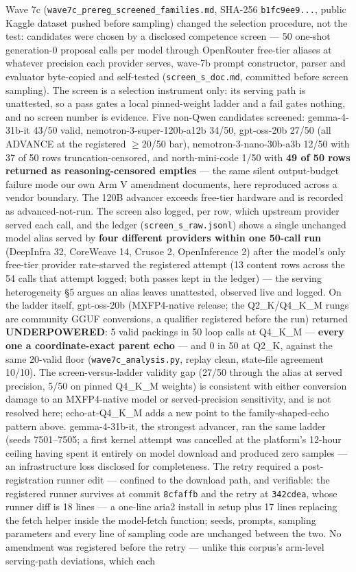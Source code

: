 Wave 7c (\texttt{wave7c\_prereg\_screened\_families.md}, SHA-256 \texttt{b1fc9ee9...}, public Kaggle dataset pushed before sampling) changed the selection procedure, not the test: candidates were chosen by a disclosed competence screen --- 50 one-shot generation-0 proposal calls per model through OpenRouter free-tier aliases at whatever precision each provider serves, wave-7b prompt constructor, parser and evaluator byte-copied and self-tested (\texttt{screen\_s\_doc.md}, committed before screen sampling). The screen is a selection instrument only: its serving path is unattested, so a pass gates a local pinned-weight ladder and a fail gates nothing, and no screen number is evidence. Five non-Qwen candidates screened: gemma-4-31b-it 43/50 valid, nemotron-3-super-120b-a12b 34/50, gpt-oss-20b 27/50 (all ADVANCE at the registered $\ge$20/50 bar), nemotron-3-nano-30b-a3b 12/50 with 37 of 50 rows truncation-censored, and north-mini-code 1/50 with \textbf{49 of 50 rows returned as reasoning-censored empties} --- the same silent output-budget failure mode our own Arm V amendment documents, here reproduced across a vendor boundary. The 120B advancer exceeds free-tier hardware and is recorded as advanced-not-run. The screen also logged, per row, which upstream provider served each call, and the ledger (\texttt{screen\_s\_raw.jsonl}) shows a single unchanged model alias served by \textbf{four different providers within one 50-call run} (DeepInfra 32, CoreWeave 14, Crusoe 2, OpenInference 2) after the model's only free-tier provider rate-starved the registered attempt (13 content rows across the 54 calls that attempt logged; both passes kept in the ledger) --- the serving heterogeneity \S5 argues an alias leaves unattested, observed live and logged. On the ladder itself, gpt-oss-20b (MXFP4-native release; the Q2\_K/Q4\_K\_M rungs are community GGUF conversions, a qualifier registered before the run) returned \textbf{UNDERPOWERED}: 5 valid packings in 50 loop calls at Q4\_K\_M --- \textbf{every one a coordinate-exact parent echo} --- and 0 in 50 at Q2\_K, against the same 20-valid floor (\texttt{wave7c\_analysis.py}, replay clean, state-file agreement 10/10). The screen-versus-ladder validity gap (27/50 through the alias at served precision, 5/50 on pinned Q4\_K\_M weights) is consistent with either conversion damage to an MXFP4-native model or served-precision sensitivity, and is not resolved here; echo-at-Q4\_K\_M adds a new point to the family-shaped-echo pattern above. gemma-4-31b-it, the strongest advancer, ran the same ladder (seeds 7501--7505; a first kernel attempt was cancelled at the platform's 12-hour ceiling having spent it entirely on model download and produced zero samples --- an infrastructure loss disclosed for completeness. The retry required a post-registration runner edit --- confined to the download path, and verifiable: the registered runner survives at commit \texttt{8cfaffb} and the retry at \texttt{342cdea}, whose runner diff is 18 lines --- a one-line aria2 install in setup plus 17 lines replacing the fetch helper inside the model-fetch function; seeds, prompts, sampling parameters and every line of sampling code are unchanged between the two. No amendment was registered before the retry --- unlike this corpus's arm-level serving-path deviations, which each 
